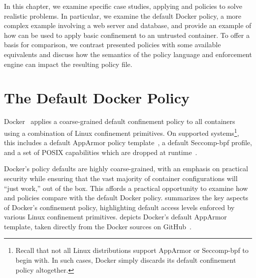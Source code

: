 In this chapter, we examine specific case studies, applying \bpfbox{} and \bpfcontain{}
policies to solve realistic problems. In particular, we examine the default Docker policy,
a more complex example involving a web server and database, and provide an example of how
\bpfcontain{} can be used to apply basic confinement to an untrusted container. To offer
a basis for comparison, we contrast presented policies with some available equivalents and
discuss how the semantics of the policy language and enforcement engine can impact the
resulting policy file.




\section{The Default Docker Policy}

Docker~\cite{docker_security} applies a coarse-grained default confinement policy to all
containers using a combination of Linux confinement primitives. On supported
systems\footnote{Recall that not all Linux distributions support AppArmor or Seccomp-bpf
to begin with. In such cases, Docker simply discards its default confinement policy
altogether.}, this includes a default AppArmor policy template~\cite{docker_apparmor,
docker_default_apparmor}, a default Seccomp-bpf profile, and a set of POSIX capabilities
which are dropped at runtime~\cite{docker_security}.

Docker's policy defaults are highly coarse-grained, with an emphasis on practical security
while ensuring that the vast majority of container configurations will \enquote{just
work,} out of the box. This affords a practical opportunity to examine how \bpfbox{} and
\bpfcontain{} policies compare with the default Docker policy. 
summarizes the key aspects of Docker's confinement policy, highlighting default access
levels enforced by various Linux confinement primitives.  depicts
Docker's default AppArmor template, taken directly from the Docker sources on
GitHub~\cite{docker_default_apparmor}.

